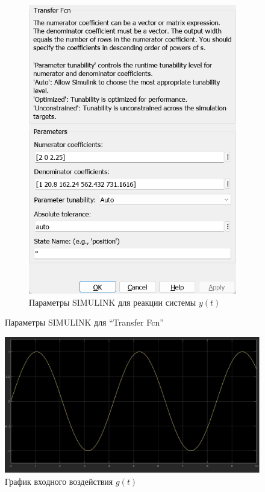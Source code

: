 \documentclass[a4paper, 12pt]{article}
\begin{document}
\begin{figure}[H]
\begin{subfigure}{0.3\textwidth}
            \includegraphics[width=\linewidth]{scheme3_window_tf.png}
            \caption{Параметры SIMULINK для реакции системы $y(t)$}
            \label{fig:yt}
        \end{subfigure}
        \caption{Параметры SIMULINK для ``Transfer Fcn''}
        \label{fig:windows3}
    \end{figure}
    \begin{figure}[H]
        \centering
        \includegraphics[scale=0.3]{task_3_g.jpg}
        \captionsetup{skip=0pt}
        \caption{График входного воздействия $g(t)$}
        \label{fig:gt2}
    \end{figure}
\end{document}
